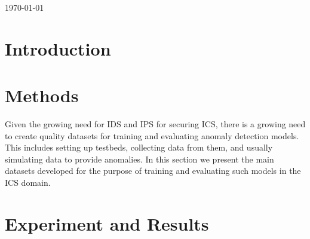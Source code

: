 \documentclass[english,12pt]{article}
\begin{document}
\begin{titlepage}


{\large \today}\\[3cm] 


\vfill %

\end{titlepage}

\pagebreak{}


\tableofcontents{}

\pagebreak{}


\section{Introduction} \label{introduction}




\pagebreak{}

\section{Methods} \label{methods}

Given the growing need for IDS and IPS for securing ICS, there is a growing need to create
quality datasets for training and evaluating anomaly detection models. This includes setting up
testbeds, collecting data from them, and usually simulating data to provide anomalies. In this section
we present the main datasets developed for the purpose of training and evaluating such models in the
ICS domain.

\pagebreak{}

\section{Experiment and Results} \label{experiment and results}
\end{document}
